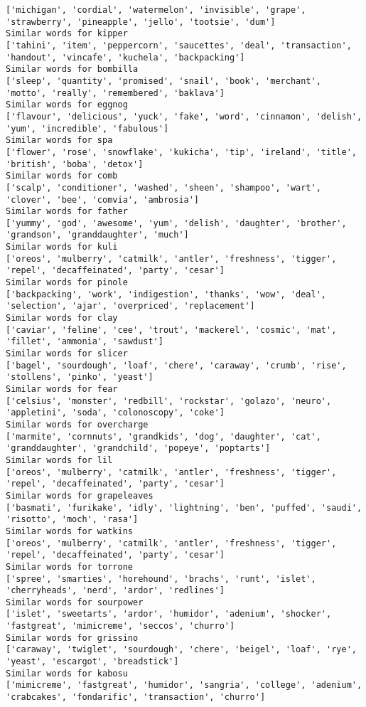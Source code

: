 \documentclass[11pt]{article}
\begin{document}
\begin{Verbatim}[commandchars=\\\{\}]
['michigan', 'cordial', 'watermelon', 'invisible', 'grape', 'strawberry', 'pineapple', 'jello', 'tootsie', 'dum']
Similar words for kipper
['tahini', 'item', 'peppercorn', 'saucettes', 'deal', 'transaction', 'handout', 'vincafe', 'kuchela', 'backpacking']
Similar words for bombilla
['sleep', 'quantity', 'promised', 'snail', 'book', 'merchant', 'motto', 'really', 'remembered', 'baklava']
Similar words for eggnog
['flavour', 'delicious', 'yuck', 'fake', 'word', 'cinnamon', 'delish', 'yum', 'incredible', 'fabulous']
Similar words for spa
['flower', 'rose', 'snowflake', 'kukicha', 'tip', 'ireland', 'title', 'british', 'boba', 'detox']
Similar words for comb
['scalp', 'conditioner', 'washed', 'sheen', 'shampoo', 'wart', 'clover', 'bee', 'comvia', 'ambrosia']
Similar words for father
['yummy', 'god', 'awesome', 'yum', 'delish', 'daughter', 'brother', 'grandson', 'granddaughter', 'much']
Similar words for kuli
['oreos', 'mulberry', 'catmilk', 'antler', 'freshness', 'tigger', 'repel', 'decaffeinated', 'party', 'cesar']
Similar words for pinole
['backpacking', 'work', 'indigestion', 'thanks', 'wow', 'deal', 'selection', 'ajar', 'overpriced', 'replacement']
Similar words for clay
['caviar', 'feline', 'cee', 'trout', 'mackerel', 'cosmic', 'mat', 'fillet', 'ammonia', 'sawdust']
Similar words for slicer
['bagel', 'sourdough', 'loaf', 'chere', 'caraway', 'crumb', 'rise', 'stollens', 'pinko', 'yeast']
Similar words for fear
['celsius', 'monster', 'redbill', 'rockstar', 'golazo', 'neuro', 'appletini', 'soda', 'colonoscopy', 'coke']
Similar words for overcharge
['marmite', 'cornnuts', 'grandkids', 'dog', 'daughter', 'cat', 'granddaughter', 'grandchild', 'popeye', 'poptarts']
Similar words for lil
['oreos', 'mulberry', 'catmilk', 'antler', 'freshness', 'tigger', 'repel', 'decaffeinated', 'party', 'cesar']
Similar words for grapeleaves
['basmati', 'furikake', 'idly', 'lightning', 'ben', 'puffed', 'saudi', 'risotto', 'moch', 'rasa']
Similar words for watkins
['oreos', 'mulberry', 'catmilk', 'antler', 'freshness', 'tigger', 'repel', 'decaffeinated', 'party', 'cesar']
Similar words for torrone
['spree', 'smarties', 'horehound', 'brachs', 'runt', 'islet', 'cherryheads', 'nerd', 'ardor', 'redlines']
Similar words for sourpower
['islet', 'sweetarts', 'ardor', 'humidor', 'adenium', 'shocker', 'fastgreat', 'mimicreme', 'seccos', 'churro']
Similar words for grissino
['caraway', 'twiglet', 'sourdough', 'chere', 'beigel', 'loaf', 'rye', 'yeast', 'escargot', 'breadstick']
Similar words for kabosu
['mimicreme', 'fastgreat', 'humidor', 'sangria', 'college', 'adenium', 'crabcakes', 'fondarific', 'transaction', 'churro']

\end{Verbatim}
\end{document}
